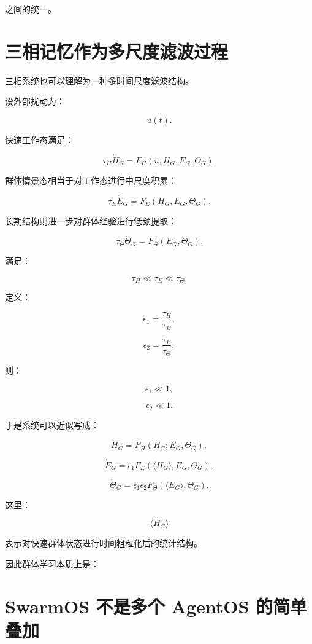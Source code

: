 之间的统一。


\section{三相记忆作为多尺度滤波过程}

三相系统也可以理解为一种多时间尺度滤波结构。

设外部扰动为：

\[
u(t).
\]

快速工作态满足：

\[
\tau_H \dot H_G
=
F_H(u,H_G,E_G,\Theta_G).
\]

群体情景态相当于对工作态进行中尺度积累：

\[
\tau_E \dot E_G
=
F_E(H_G,E_G,\Theta_G).
\]

长期结构则进一步对群体经验进行低频提取：

\[
\tau_\Theta \dot \Theta_G
=
F_\Theta(E_G,\Theta_G).
\]

满足：

\[
\tau_H
\ll
\tau_E
\ll
\tau_\Theta.
\]

定义：

\[
\epsilon_1
=
\frac{\tau_H}{\tau_E},
\]

\[
\epsilon_2
=
\frac{\tau_E}{\tau_\Theta},
\]

则：

\[
\epsilon_1
\ll
1,
\]

\[
\epsilon_2
\ll
1.
\]

于是系统可以近似写成：

\[
\dot H_G
=
F_H(H_G;E_G,\Theta_G),
\]

\[
\dot E_G
=
\epsilon_1
F_E(\langle H_G\rangle,E_G,\Theta_G),
\]

\[
\dot\Theta_G
=
\epsilon_1\epsilon_2
F_\Theta(\langle E_G\rangle,\Theta_G).
\]

这里：

\[
\langle H_G\rangle
\]

表示对快速群体状态进行时间粗粒化后的统计结构。

因此群体学习本质上是：

\begin{statementbox}
\centering
{}
\end{statementbox}


\section{SwarmOS 不是多个 AgentOS 的简单叠加}

